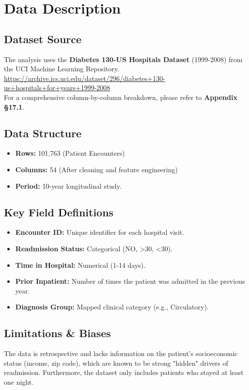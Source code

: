 \documentclass[12pt,a4paper]{article}
\begin{document}
\section{Data Description}
\subsection{Dataset Source}
The analysis uses the \textbf{Diabetes 130-US Hospitals Dataset} (1999-2008) from the UCI Machine Learning Repository. 
\href{https://archive.ics.uci.edu/dataset/296/diabetes+130-us+hospitals+for+years+1999-2008}{https://archive.ics.uci.edu/dataset/296/diabetes+130-us+hospitals+for+years+1999-2008} \\
For a comprehensive column-by-column breakdown, please refer to \textbf{Appendix §17.1}.

\subsection{Data Structure}
\begin{itemize}
    \item \textbf{Rows:} 101,763 (Patient Encounters)
    \item \textbf{Columns:} 54 (After cleaning and feature engineering)
    \item \textbf{Period:} 10-year longitudinal study.
\end{itemize}

\subsection{Key Field Definitions}
\begin{itemize}
    \item \textbf{Encounter ID:} Unique identifier for each hospital visit.
    \item \textbf{Readmission Status:} Categorical (NO, >30, <30).
    \item \textbf{Time in Hospital:} Numerical (1-14 days).
    \item \textbf{Prior Inpatient:} Number of times the patient was admitted in the previous year.
    \item \textbf{Diagnosis Group:} Mapped clinical category (e.g., Circulatory).
\end{itemize}

\subsection{Limitations \& Biases}
The data is retrospective and lacks information on the patient's socioeconomic status (income, zip code), which are known to be strong "hidden" drivers of readmission. Furthermore, the dataset only includes patients who stayed at least one night.
\end{document}
